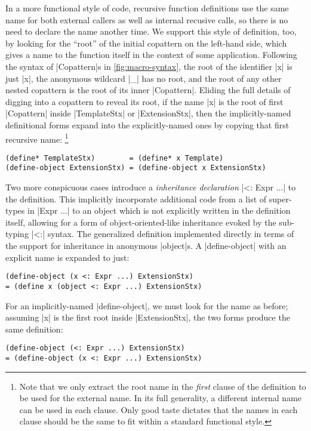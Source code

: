 In a more functional style of code, recursive function definitions use the same name for both external callers as well as internal recusive calls, so there is no need to declare the name another time.
We support this style of definition, too, by looking for the ``root'' of the initial copattern on the left-hand side, which gives a name to the function itself in the context of some application.
Following the syntax of \scm|Copattern|s in \cref{fig:macro-syntax}, the root of the identifier \scm|x| is just \scm|x|, the anonymous wildcard \scm|_| has no root, and the root of any other nested copattern is the root of its inner \scm|Copattern|.
Eliding the full details of digging into a copattern to reveal its root, if the name \scm|x| is the root of first \scm|Copattern| inside \scm|TemplateStx| or \scm|ExtensionStx|, then the implicitly-named definitional forms expand into the explicitly-named ones by copying that first recursive name:%
\footnote{Note that we only extract the root name in the \emph{first} clause of the definition to be used for the external name.
  In its full generality, a different internal name can be used in each clause.
  Only good taste dictates that the names in each clause should be the same to fit within a standard functional style.}
\begin{verbatim}
(define* TemplateStx)        = (define* x Template)
(define-object ExtensionStx) = (define-object x ExtensionStx)
\end{verbatim}

Two more conspicuous cases introduce a \emph{inheritance declaration}
\scm|<: Expr ...| to the definition.
This implicitly incorporate additional code from a list of super-types in \scm|Expr ...| to an object which is not explicitly written in the definition itself, allowing for a form of object-oriented-like inheritance evoked by the sub-typing \scm|<:| syntax.
The generalized definition implemented directly in terms of the support for inheritance in anonymous \scm|object|s.
A \scm|define-object| with an explicit name is expanded to just:
\begin{verbatim}
(define-object (x <: Expr ...) ExtensionStx)
= (define x (object <: Expr ...) ExtensionStx)
\end{verbatim}
For an implicitly-named \scm|define-object|, we must look for the name as before; assuming \scm|x| is the first root inside \scm|ExtensionStx|, the two forms produce the same definition:
\begin{verbatim}
(define-object (<: Expr ...) ExtensionStx)
= (define-object (x <: Expr ...) ExtensionStx)
\end{verbatim}

